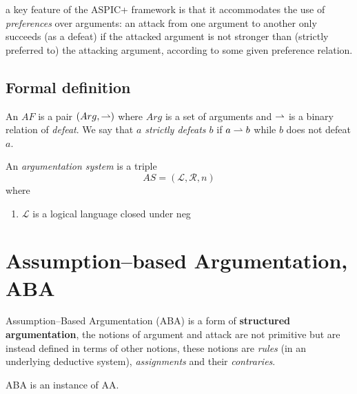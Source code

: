 a key feature of the ASPIC+ framework is that it accommodates the use of \textit{preferences} over arguments: 
% 
an attack from one argument to another only succeeds (as a defeat) if the attacked argument is not stronger than (strictly preferred to) the attacking argument,
according to some given preference relation.




\subsection{Formal definition}


An $AF$ is a pair $(Arg,\rightharpoonup)$ where $Arg$ is a set of arguments and $\rightharpoonup$ is a binary relation of \textit{defeat}.
% 
We say that \textit{$a$ strictly defeats $b$} if $a \rightharpoonup b$ while $b$ does not defeat $a$.


\begin{df}
    An \textit{argumentation system} is a triple 
    \[
        AS = (\mathcal{L},\mathcal{R},n)
    \]    
    where 
    \begin{enumerate}[itemsep=5pt,parsep=5pt,leftmargin=3em,topsep=5pt,label=(\arabic*)] %
        \item 
        $\mathcal{L}$ is a logical language closed under neg
    \end{enumerate}
\end{df}












\clearpage
\section{Assumption--based Argumentation, ABA}


Assumption--Based Argumentation (ABA) is a form of \textbf{structured argumentation}, 
the notions of argument and attack are not primitive but are instead defined in terms of other notions, 
these notions are  
\textit{rules} (in an underlying deductive system), 
\textit{assignments} and their \textit{contraries}.


ABA is an instance of AA.



\vspace{1.5em}

